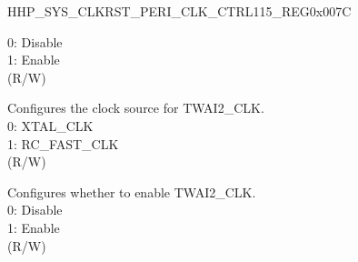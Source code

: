 \begin{register}{H}{HP\_SYS\_CLKRST\_PERI\_CLK\_CTRL115\_REG}{0x007C}
\begin{regdesc}
\begin{reglist}
0: Disable\\
1: Enable\\(R/W)
\label{fielddesc:HPSYSCLKRSTTWAI2CLKSRCSEL}\item [HP\_SYS\_CLKRST\_TWAI2\_CLK\_SRC\_SEL] Configures the clock source for TWAI2\_CLK.\\0: XTAL\_CLK\\ 1: RC\_FAST\_CLK\\ (R/W)
\label{fielddesc:HPSYSCLKRSTTWAI2CLKEN}\item [HP\_SYS\_CLKRST\_TWAI2\_CLK\_EN] Configures whether to enable TWAI2\_CLK.\\
0: Disable\\
1: Enable\\(R/W)
\end{reglist}\end{regdesc}
\end{register}


